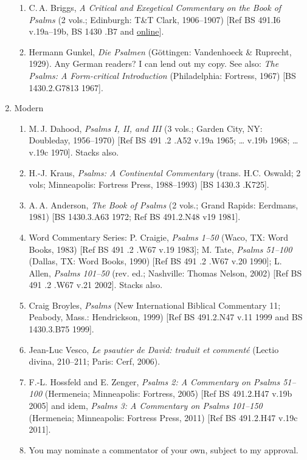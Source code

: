 \documentclass[titlepage]{article}
\begin{document}
\begin{enumerate}
\begin{enumerate}
	\item C.\,A. Briggs, \emph{A Critical and Exegetical Commentary on the Book of Psalms} (2 vols.; Edinburgh: T\&T Clark, 1906--1907)
	[Ref BS 491.I6 v.19a–19b, BS 1430 .B7 and \href{https://archive.org/details/criticalexegetic02briguoft}{online}].

	\item Hermann Gunkel, \emph{Die Psalmen} (Göttingen: Vandenhoeck \& Ruprecht, 1929). Any German readers? I can lend out my copy. See also: \emph{The Psalms: A Form-critical Introduction} (Philadelphia: Fortress, 1967) [BS 1430.2.G7813 1967].

  \end{enumerate}
 \item Modern
  \begin{enumerate}

  \item M.\,J. Dahood, \emph{Psalms I, II, and III} (3 vols.; Garden City, NY: Doubleday, 1956--1970) [Ref BS 491 .2 .A52 v.19a 1965; … v.19b 1968; … v.19c 1970]. Stacks also.

  \item H.-J. Kraus, \emph{Psalms: A Continental Commentary} (trans. H.C. Oswald; 2 vols; Minneapolis: Fortress Press, 1988--1993) [BS 1430.3 .K725].

  \item A.\,A. Anderson, \emph{The Book of Psalms} (2 vols.; Grand Rapids: Eerdmans, 1981) [BS 1430.3.A63 1972; Ref BS 491.2.N48 v19 1981].

	\item Word Commentary Series: P. Craigie, \emph{Psalms 1--50} (Waco, TX: Word Books, 1983) [Ref BS 491 .2 .W67 v.19 1983]; M. Tate, \emph{Psalms 51--100} (Dallas, TX: Word Books, 1990) [Ref BS 491 .2 .W67 v.20 1990]; L. Allen, \emph{Psalms 101--50} (rev. ed.; Nashville: Thomas Nelson, 2002) [Ref BS 491 .2 .W67 v.21 2002]. Stacks also.

  \item Craig Broyles, \emph{Psalms} (New International Biblical Commentary 11; Peabody, Mass.: Hendrickson, 1999) [Ref BS 491.2.N47 v.11 1999 and BS 1430.3.B75 1999].

  \item Jean-Luc Vesco, \emph{Le psautier de David: traduit et commenté} (Lectio divina, 210--211; Paris: Cerf, 2006).

	\item F.-L. Hossfeld and E. Zenger, \emph{Psalms 2: A Commentary on Psalms 51--100} (Hermeneia; Minneapolis: Fortress, 2005) [Ref BS 491.2.H47 v.19b 2005] and idem, \emph{Psalms 3: A Commentary on Psalms 101--150} (Hermeneia; Minneapolis: Fortress Press, 2011) [Ref BS 491.2.H47 v.19c 2011].

  \item You may nominate a commentator of your own, subject to my approval.

  \end{enumerate}
\end{enumerate}
\end{document}
